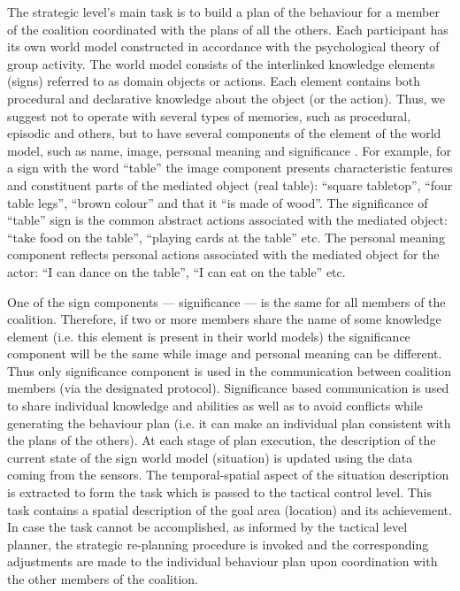 \documentclass[review]{elsarticle}
\begin{document}
The strategic level's main task is to build a plan of the behaviour for a member of the coalition coordinated with the plans of all the others. Each participant has its own world model constructed in accordance with the psychological theory of group activity. The world model consists of the interlinked knowledge elements (signs) referred to as domain objects or actions. Each element contains both procedural and declarative knowledge about the object (or the action). Thus, we suggest not to operate with several types of memories, such as procedural, episodic and others, but to have several components of the element of the world model, such as name, image, personal meaning and significance \cite{Leontiev2009}. For example, for a sign with the word ``table'' the image component presents characteristic features and constituent parts of the mediated object (real table): ``square tabletop'', ``four table legs'', ``brown colour'' and that it ``is made of wood''. The significance of ``table'' sign is the common abstract actions associated with the mediated object: ``take food on the table'', ``playing cards at the table'' etc. The personal meaning component reflects personal actions associated with the mediated object for the actor: ``I can dance on the table'', ``I can eat on the table'' etc.

One of the sign components --- significance --- is the same for all members of the coalition. Therefore, if two or more members share the name of some knowledge element (i.e. this element is present in their world models) the significance component will be the same while image and personal meaning can be different. Thus only significance component is used in the communication between coalition members (via the designated protocol). Significance based communication is used to share individual knowledge and abilities as well as to avoid conflicts while generating the behaviour plan (i.e. it can make an individual plan consistent with the plans of the others). At each stage of plan execution, the description of the current state of the sign world model (situation) is updated using the data coming from the sensors. The temporal-spatial aspect of the situation description is extracted to form the task which is passed to the tactical control level. This task contains a spatial description of the goal area (location) and its achievement. In case the task cannot be accomplished, as informed by the tactical level planner, the strategic re-planning procedure is invoked and the corresponding adjustments are made to the individual behaviour plan upon coordination with the other members of the coalition.
\end{document}
